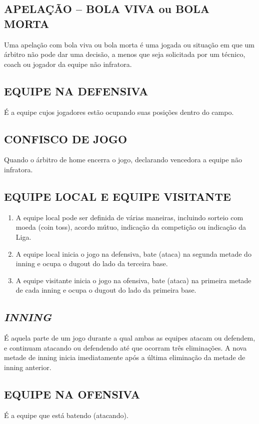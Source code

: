 \subsection{APELAÇÃO -- BOLA VIVA ou BOLA MORTA}
 Uma apelação com bola viva ou bola morta é uma jogada ou situação em que um árbitro não pode dar uma decisão, a menos que seja solicitada por um  técnico, \gls{coach} ou jogador da equipe não infratora.

\subsection{EQUIPE NA DEFENSIVA}
 É a equipe cujos jogadores estão ocupando suas posições dentro do campo.
\subsection{CONFISCO DE JOGO}

Quando o árbitro de \gls{home} encerra o jogo, declarando vencedora a equipe não infratora.

\subsection{EQUIPE LOCAL E EQUIPE VISITANTE}
	\begin{enumerate}[label=(\alph*)]
		\item A equipe local pode ser definida de várias maneiras, incluindo sorteio com  moeda (\gls{coin toss}), acordo mútuo, indicação da competição ou indicação da  Liga.
		\item A equipe local inicia o jogo na defensiva, bate (ataca) na segunda metade do \gls{inning} e ocupa o \gls{dugout} do lado da terceira base.
		\item A equipe visitante inicia o jogo na ofensiva, bate (ataca) na primeira metade  de cada \gls{inning} e ocupa o \gls{dugout} do lado da primeira base.
	\end{enumerate}

\subsection{\textit{INNING}}
 É aquela parte de um jogo durante a qual ambas as equipes atacam ou defendem, e continuam atacando ou defendendo até que ocorram três eliminações. A nova metade de \gls{inning} inicia imediatamente após a última  eliminação da metade de \gls{inning} anterior.

\subsection{EQUIPE NA OFENSIVA}
 É a equipe que está batendo (atacando).

